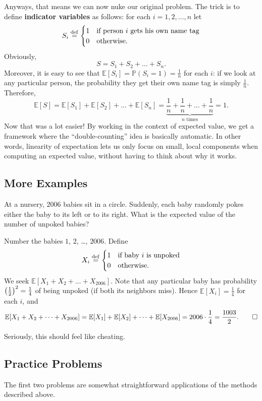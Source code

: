 \documentclass[11pt]{scrartcl}
\newcommand\EE{\mathbb E}
\newcommand\PP{\mathbb P}
\begin{document}
Anyways, that means we can now nuke our original problem.
The trick is to define \textbf{indicator variables} as follows: for each $i=1,2,\dots,n$ let
\[ 
	S_i \overset{\mathrm{def}}{=}
	\begin{cases}
		1 & \text{if person $i$ gets his own name tag} \\
		0 & \text{otherwise}.
	\end{cases}
	\]
Obviously, \[ S = S_1 + S_2 + \dots + S_n. \]
Moreover, it is easy to see that $\EE[S_i] = \PP(S_i = 1) =  \frac 1n$ for each $i$:
if we look at any particular person, the probability they get their own name tag is
simply $\frac 1n$.
Therefore, 
\[ \EE[S] = \EE[S_1] + \EE[S_2] + \dots + \EE[S_n]
	= \underbrace{\frac1n + \frac1n + \dots + \frac 1n}_{\text{$n$ times}}
	= 1. \]
Now that was a lot easier!
By working in the context of expected value, we get a framework
where the ``double-counting'' idea is basically automatic.
In other words, linearity of expectation lets us only focus on small, local components
when computing an expected value, without having to think about why it works.

\subsection{More Examples}
\begin{example}
	[HMMT 2006] At a nursery, $2006$ babies sit in a circle. Suddenly, each baby randomly pokes either the baby to its left or to its right. What is the expected value of the number of unpoked babies?
\end{example}
\begin{soln}
	Number the babies $1$, $2$, \dots, $2006$.  Define
	\[
		X_i \overset{\mathrm{def}}{=} 
		\begin{cases}
			1 & \text{if baby $i$ is unpoked} \\
			0 & \text{otherwise}.
		\end{cases}
	\]
	We seek $\EE[X_1 + X_2 + \dots + X_{2006}]$.
	Note that any particular baby has probability $\left( \frac{1}{2} \right)^2 = \frac 14$ of being unpoked (if both its neighbors miss).
	Hence $\EE[X_i] = \frac 14$ for each $i$, and
	\[ \EE[X_1 + X_2 + \dots + X_{2006}]
	= \EE[X_1] + \EE[X_2] + \dots + \EE[X_{2006}]
	= 2006 \cdot \frac 14
	= \frac{1003}{2}. \qedhere \]
\end{soln}
Seriously, this should feel like cheating.

\subsection{Practice Problems}
The first two problems are somewhat straightforward applications of the methods described above.
\end{document}
